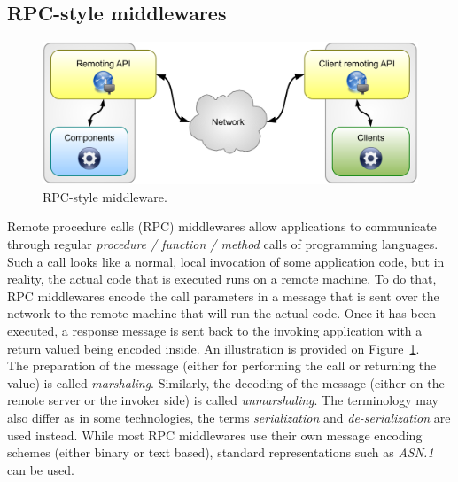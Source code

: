 
\subsection{RPC-style middlewares}


\begin{figure}[htbp]
    \centering
    \includegraphics[width=\textwidth]{content/web-services/rpc-middleware}
    \caption{RPC-style middleware.}
    \label{fig:rpc-middleware}
\end{figure}

Remote procedure calls (RPC) middlewares allow applications to communicate through regular \emph{procedure / function / method} calls of programming languages. Such a call looks like a normal, local invocation of some application code, but in reality, the actual code that is executed runs on a remote machine. To do that, RPC middlewares encode the call parameters in a message that is sent over the network to the remote machine that will run the actual code. Once it has been executed, a response message is sent back to the invoking application with a return valued being encoded inside. An illustration is provided on Figure~\ref{fig:rpc-middleware}. \\

The preparation of the message (either for performing the call or returning the value) is called \emph{marshaling}. Similarly, the decoding of the message (either on the remote server or the invoker side) is called \emph{unmarshaling}. The terminology may also differ as in some technologies, the terms \emph{serialization} and \emph{de-serialization} are used instead. While most RPC middlewares use their own message encoding schemes (either binary or text based), standard representations such as \emph{ASN.1} can be used.\\

